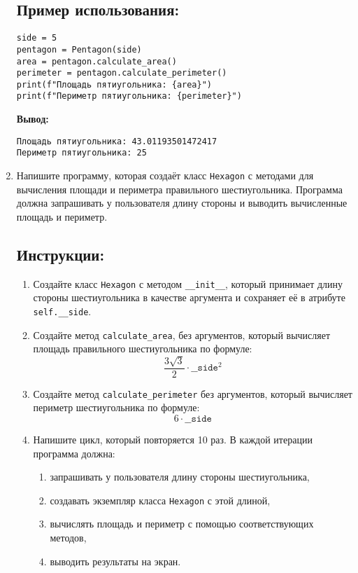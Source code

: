 \begin{enumerate}
\subsection*{Пример использования:}
\begin{verbatim}
side = 5
pentagon = Pentagon(side)
area = pentagon.calculate_area()
perimeter = pentagon.calculate_perimeter()
print(f"Площадь пятиугольника: {area}")
print(f"Периметр пятиугольника: {perimeter}")
\end{verbatim}

\textbf{Вывод:}
\begin{verbatim}
Площадь пятиугольника: 43.01193501472417
Периметр пятиугольника: 25
\end{verbatim}

\item
Напишите программу, которая создаёт класс \texttt{Hexagon} с методами для вычисления площади
и периметра правильного шестиугольника. Программа должна запрашивать у пользователя длину стороны
и выводить вычисленные площадь и периметр.

\subsection*{Инструкции:}
\begin{enumerate}
\item Создайте класс \texttt{Hexagon} с методом
\texttt{\_\_init\_\_}, который принимает длину стороны шестиугольника в
качестве аргумента и сохраняет её в атрибуте \texttt{self.\_\_side}.

\item Создайте метод \texttt{calculate\_area},
без аргументов, который вычисляет площадь правильного шестиугольника по формуле:
\[
\frac{3\sqrt{3}}{2} \cdot \texttt{\_\_side}^2
\]

\item Создайте метод \texttt{calculate\_perimeter} без аргументов,
который вычисляет периметр шестиугольника по формуле:
\[
6 \cdot \texttt{\_\_side}
\]

\item Напишите цикл, который повторяется 10 раз. В каждой итерации программа должна:
\begin{enumerate}
\item запрашивать у пользователя длину стороны шестиугольника,
\item создавать экземпляр класса \texttt{Hexagon} с этой длиной,
\item вычислять площадь и периметр с помощью соответствующих методов,
\item выводить результаты на экран.
\end{enumerate}
\end{enumerate}


\end{enumerate}
